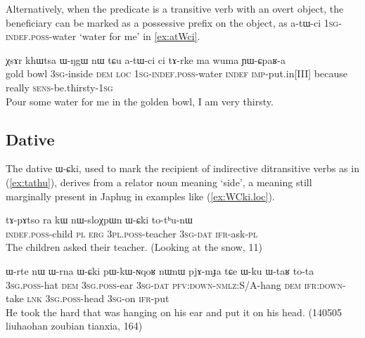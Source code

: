 \documentclass[oldfontcommands,oneside,a4paper,11pt]{article}
\newcommand{\ipa}[1]{\mbox{\phon #1}} %
\begin{document}
Alternatively, when the predicate is a transitive verb with an overt object, the beneficiary can be marked as a possessive prefix on the object, as 	\ipa{a-tɯ-ci} \textsc{1sg-indef.poss}-water `water for me' in \ref{ex:atWci}.

\begin{exe}
\ex \label{ex:atWci}
\gll \ipa{χsɤr}  	\ipa{khɯtsa}  	\ipa{ɯ-ŋgɯ}  	\ipa{nɯ}  	\ipa{tɕu}  	\ipa{a-tɯ-ci}  	\ipa{ci}  	\ipa{tɤ-rke}  	\ipa{ma}  	\ipa{wuma}  	\ipa{ɲɯ-ɕpaʁ-a}  \\
gold bowl \textsc{3sg}-inside \textsc{dem} \textsc{loc} \textsc{1sg-indef.poss}-water \textsc{indef} \textsc{imp}-put.in[III] because really \textsc{sens}-be.thirsty-\textsc{1sg} \\
\glt Pour some water for me in the golden bowl, I am very thirsty.
\end{exe}

\subsection{Dative}  \label{sec:dat}
The dative \ipa{ɯ-ɕki}, used to mark the recipient of indirective ditransitive verbs as in (\ref{ex:tathu}), derives from a relator noun  meaning `side', a meaning still marginally present in Japhug in examples like (\ref{ex:WCki.loc}).

 \begin{exe}
   \ex   \label{ex:tathu}
 \gll \ipa{tɤ-pɤtso}  	\ipa{ra}  	\ipa{kɯ}  	\ipa{nɯ-sloχpɯn}  	\ipa{ɯ-ɕki}  	\ipa{to-tʰu-nɯ}  \\
\textsc{indef.poss}-child \textsc{pl} \textsc{erg} \textsc{3pl.poss}-teacher \textsc{3sg-dat} \textsc{ifr}-ask-\textsc{pl} \\
\glt The children asked their teacher. (Looking at the snow, 11)
   \end{exe}  

\begin{exe}
\ex \label{ex:WCki.loc}
\gll \ipa{ɯ-rte} 	\ipa{nɯ} 	\ipa{ɯ-rna} 	\ipa{ɯ-ɕki} 	\ipa{pɯ-kɯ-ɴqoʁ} 	\ipa{nɯnɯ} 	\ipa{pjɤ-mɟa} 	\ipa{tɕe} 	\ipa{ɯ-ku} 	\ipa{ɯ-taʁ} 	\ipa{to-ta} \\
\textsc{3sg.poss}-hat \textsc{dem} \textsc{3sg.poss}-ear \textsc{3sg}-\textsc{dat} \textsc{pfv:down-nmlz}:S/A-hang \textsc{dem} \textsc{ifr:down}-take \textsc{lnk} \textsc{3sg.poss}-head \textsc{3sg}-on \textsc{ifr}-put \\
\glt He took the hard that was hanging on his ear and put it on his head. (140505 liuhaohan zoubian tianxia, 164)
\end{exe}
\end{document}
